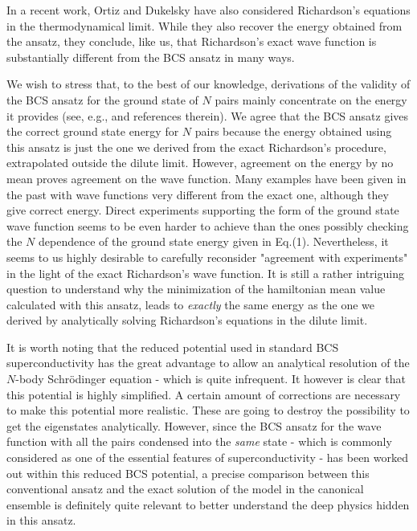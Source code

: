 \documentclass[aps,prb,superscriptaddress,showpacs,reprint,lengthcheck]{revtex4}
\begin{document}
In a recent work, Ortiz and Dukelsky\cite{crossoverRich} have also considered Richardson's equations in the thermodynamical limit. While they also recover the energy obtained from the ansatz, they conclude, like us, that Richardson's exact wave function is substantially different from the BCS ansatz in many ways.   


We wish to stress that, 
to the best of our knowledge,  derivations of the validity of the BCS ansatz for the ground state of $N$ pairs
mainly concentrate on the energy it provides 
(see, e.g., \cite{Schrieffer} and references therein).
 We agree that the BCS
ansatz gives the correct ground state energy for $N$ pairs because the energy obtained using this ansatz
is just the one we derived from the exact Richardson's procedure, extrapolated outside the dilute limit. However,
agreement on the energy by no mean proves agreement on the wave function.
Many examples have been given in the past with wave functions very different
from the exact one, although they give correct energy. Direct
experiments supporting the form of the ground state wave function seems to be even harder to achieve than the ones possibly checking the $N$ dependence of the ground state energy given in Eq.(1). 
Nevertheless, it seems to us highly desirable to carefully reconsider "agreement 
with experiments" in the light of the exact Richardson's wave function. It is still a rather intriguing question to understand why the minimization of the hamiltonian mean value calculated with this ansatz, leads to \emph{exactly} the same energy as the one we derived by analytically solving Richardson's equations in the dilute limit.

It is worth noting that the reduced potential used in standard BCS superconductivity has the great advantage to allow an analytical resolution of the $N$-body Schr\"{o}dinger equation - which is quite infrequent. It however is clear that this potential is highly simplified. A certain amount of corrections are necessary to make this potential more realistic. These are going to destroy the possibility to get the eigenstates analytically. However, since the BCS ansatz for the wave function with all the pairs condensed into the \emph{same} state - which is commonly considered as one of the essential features of superconductivity - has been worked out within this reduced BCS potential, a precise comparison between this conventional ansatz and the exact solution of the model in the canonical ensemble is definitely quite relevant to better understand the deep physics hidden in this ansatz.
\end{document}
